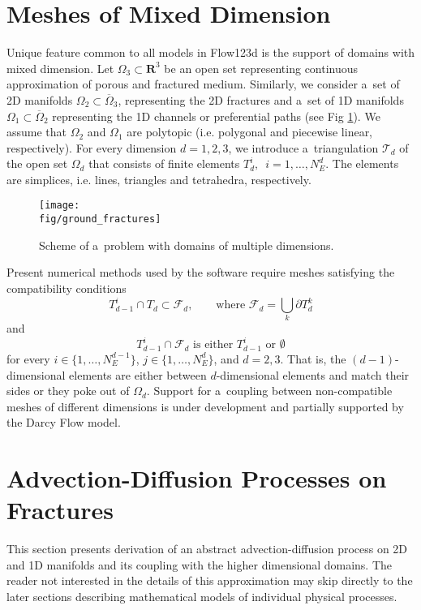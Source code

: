 \documentclass[12pt,a4paper]{report}
\def\Real{{\mathbf R}}
\def\fig{figures}
\begin{document}
\section{Meshes of Mixed Dimension}
Unique feature common to all models in Flow123d is the support of
domains with mixed dimension. 
Let $\Omega_{3} \subset \Real^3$ be an open set representing continuous approximation of porous and fractured medium.
Similarly, we consider a~set of 2D manifolds $\Omega_2\subset\overline\Omega_3$, representing the 2D fractures and a~set of 1D manifolds $\Omega_1\subset \overline\Omega_2$ 
representing the 1D channels or preferential paths (see Fig \ref{fig:multi-dim}).
We assume that $\Omega_2$ and $\Omega_1$ are polytopic (i.e. polygonal and piecewise linear, respectively).
For every dimension $d=1,2,3$, we introduce a~triangulation $\mathcal{T}_{d}$ of the open set $\Omega_d$
that consists of finite elements $T_{d}^{i},$\ $i = 1,\dots,N_{E}^{d}$.
The elements are simplices, i.e. lines, triangles and tetrahedra, respectively.

\begin{figure}[h]
\centering
\texttt{[image: \\fig/ground\_fractures]}
\caption{
    \label{fig:multi-dim}
    Scheme of a~problem with domains of multiple dimensions.
}
\end{figure}

Present numerical methods used by the software require meshes satisfying the compatibility conditions
\begin{equation}
        T_{d-1}^i \cap T_d \subset \mathcal{F}_d,   \qquad \text{where } \mathcal{F}_d = \bigcup_{k} \partial T_{d}^{k}
\end{equation}
and
\begin{equation}
        T_{d-1}^i \cap \mathcal{F}_d    \text{ is either $T_{d-1}^i$ or $\emptyset$}    
\end{equation}
for every $i\in\{1,\dots, N_{E}^{d-1}\}$, $j\in\{1,\dots,N_{E}^{d}\}$,  and $d=2,3$. 
That is, the $(d-1)$-dimensional elements are either between $d$-dimensional elements and
match their sides or they poke out of $\Omega_d$. Support for a~coupling between non-compatible
meshes of different dimensions is under development and partially supported by the Darcy Flow model.

\section{Advection-Diffusion Processes on Fractures}
\label{sc:ad_on_fractures}
This section presents derivation of an abstract advection-diffusion process on 2D and 1D manifolds and its coupling with
the higher dimensional domains. The reader not interested in the details of this approximation may skip directly to
the later sections describing mathematical models of individual physical processes.
\end{document}

